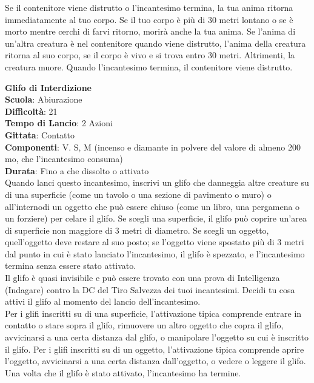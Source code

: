 \begin{multicols}{2}
Se il contenitore viene distrutto o l'incantesimo termina, la tua anima ritorna immediatamente al tuo corpo. Se il tuo corpo è più di 30 metri lontano o se è morto mentre cerchi di farvi ritorno, morirà anche la tua anima. Se l'anima di un'altra creatura è nel contenitore quando viene distrutto, l'anima della creatura ritorna al suo corpo, se il corpo è vivo e si trova entro 30 metri. Altrimenti, la creatura muore. Quando l'incantesimo termina, il contenitore viene distrutto.

\medskip\textbf{Glifo di Interdizione}\\
\textbf{Scuola}: Abiurazione\\
\textbf{Difficoltà}: 21\\
\textbf{Tempo di Lancio}: 2 Azioni\\
\textbf{Gittata}: Contatto\\
\textbf{Componenti}: V. S, M (incenso e diamante in polvere del valore di almeno 200 mo, che l'incantesimo consuma)\\
\textbf{Durata}: Fino a che dissolto o attivato \\
Quando lanci questo incantesimo, inscrivi un glifo che danneggia altre creature su di una superficie (come un tavolo o una sezione di pavimento o muro) o all'internodi un oggetto che può essere chiuso (come un libro, una pergamena o un forziere) per celare il glifo. Se scegli una superficie, il glifo può coprire un'area di superficie non maggiore di 3 metri di diametro. Se scegli un oggetto, quell'oggetto deve restare al suo posto; se l'oggetto viene spostato più di 3 metri dal punto in cui è stato lanciato l'incantesimo, il glifo è spezzato, e l'incantesimo termina senza essere stato attivato.\\
Il glifo è quasi invisibile e può essere trovato con una prova di Intelligenza (Indagare) contro la DC del Tiro Salvezza dei tuoi incantesimi. Decidi tu cosa attivi il glifo al momento del lancio dell'incantesimo.\\
Per i glifi inscritti su di una superficie, l'attivazione tipica comprende entrare in contatto o stare sopra il glifo, rimuovere un altro oggetto che copra il glifo, avvicinarsi a una certa distanza dal glifo, o manipolare l'oggetto su cui è inscritto il glifo. Per i glifi inscritti su di un oggetto, l'attivazione tipica comprende aprire l'oggetto, avvicinarsi a una certa distanza dall'oggetto, o vedere o leggere il glifo. Una volta che il glifo è stato attivato, l'incantesimo ha termine.\\

\end{multicols}
